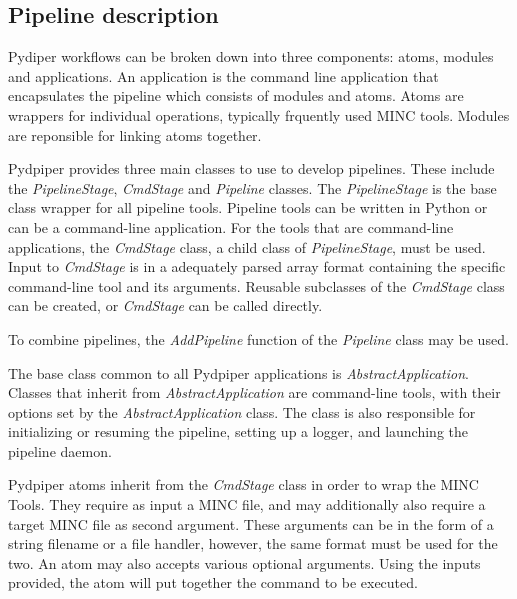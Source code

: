 \documentclass{report}
\begin{document}
        \subsection{Pipeline description} Pydiper workflows can be broken down
        into three components: atoms, modules and applications. An application
        is the command line application that encapsulates the pipeline which
        consists of modules and atoms. Atoms are wrappers for individual
        operations, typically frquently used MINC tools. Modules are reponsible
        for linking atoms together.

        Pydpiper provides three main classes to use to develop pipelines. These
        include the \textit{PipelineStage}, \textit{CmdStage} and
        \textit{Pipeline} classes. The \textit{PipelineStage} is the base class
        wrapper for all pipeline tools.  Pipeline tools can be written in Python
        or can be a command-line application.  For the tools that are
        command-line applications, the \textit{CmdStage} class, a child class of
        \textit{PipelineStage}, must be used. Input to \textit{CmdStage} is in a
        adequately parsed array format containing the specific command-line tool
        and its arguments. Reusable subclasses of the \textit{CmdStage} class
        can be created, or \textit{CmdStage} can be called directly.

        To combine pipelines, the \textit{AddPipeline} function of the
        \textit{Pipeline} class may be used.

        The base class common to all Pydpiper applications is
        \textit{AbstractApplication}.  Classes that inherit from
        \textit{AbstractApplication} are command-line tools, with their options
        set by the \textit{AbstractApplication} class. The class is also
        responsible for initializing or resuming the pipeline, setting up a
        logger, and launching the pipeline daemon.

        Pydpiper atoms inherit from the \textit{CmdStage} class in order to wrap
        the MINC Tools.  They require as input a MINC file, and may additionally
        also require a target MINC file as second argument. These arguments can
        be in the form of a string filename or a file handler, however, the same
        format must be used for the two. An atom may also accepts various
        optional arguments. Using the inputs provided, the atom will put
        together the command to be executed. 
        
\end{document}
